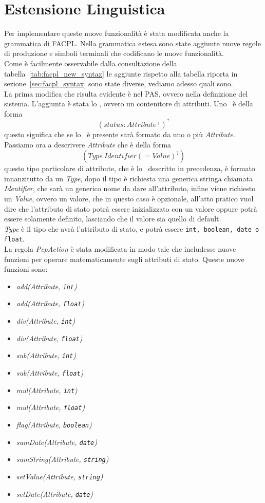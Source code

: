\section{Estensione Linguistica} %
\label{sec:estensione_linguistica}
Per implementare queste nuove funzionalità è stata modificata anche la grammatica di FACPL.
Nella grammatica estesa sono state aggiunte nuove regole di produzione e simboli terminali che 
codificano le nuove funzionalità.\\

Come è facilmente osservabile dalla consultazione della tabella~\ref{tab:facpl_new_syntax} le aggiunte rispetto alla tabella riporta in sezione~\ref{sec:facpl_syntax} sono state diverse, vediamo adesso quali sono.\\
La prima modifica che risulta evidente è nel PAS, ovvero nella definizione del sistema. L'aggiunta è stata lo \status, ovvero un contenitore di attributi.
Uno \status \ è della forma $$(status: Attribute^+)^?$$ questo significa che se lo \status \ è presente sarà formato da uno o più \textit{Attribute}.\\
Passiamo ora a descrivere \textit{Attribute} che è della forma $$(Type\ Identifier (= Value)^?)$$
questo tipo particolare di attribute, che è lo \statusattribute \ descritto in precedenza, è formato innanzitutto da un \textit{Type}, dopo il tipo è richiesta una generica stringa chiamata \textit{Identifier}, che sarà un generico nome da dare all'attributo, infine viene richiesto un \textit{Value}, ovvero un valore, che in questo caso è opzionale, all'atto pratico vuol dire che l'attributo di stato potrà essere inizializzato con un valore oppure potrà essere solamente definito, lasciando che il valore sia quello di default.\\
\textit{Type} è il tipo che avrà l'attributo di stato, e potrà essere \texttt{int, boolean, date o float}.\\
La regola \textit{PepAction} è stata modificata in modo tale che includesse nuove funzioni per operare matematicamente sugli attributi di stato.
Queste nuove funzioni sono:
\begin{itemize}
	\item \textit{add(Attribute, \texttt{int})}
	\item \textit{add(Attribute, \texttt{float})}
	\item \textit{div(Attribute, \texttt{int})}
	\item \textit{div(Attribute, \texttt{float})}
	\item \textit{sub(Attribute, \texttt{int})}
	\item \textit{sub(Attribute, \texttt{float})}
	\item \textit{mul(Attribute, \texttt{int})}
	\item \textit{mul(Attribute, \texttt{float})}
	\item \textit{flag(Attribute, \texttt{boolean})}
	\item \textit{sumDate(Attribute, \texttt{date})} 
	\item \textit{sumString(Attribute, \texttt{string})}
	\item \textit{setValue(Attribute, \texttt{string})}
	\item \textit{setDate(Attribute, \texttt{date})}
\end{itemize}
